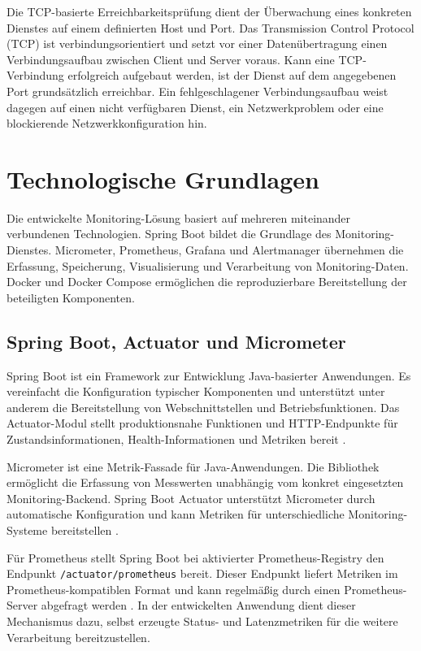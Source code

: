 Die TCP-basierte Erreichbarkeitsprüfung dient der Überwachung eines konkreten Dienstes auf einem definierten Host und Port. Das Transmission Control Protocol (TCP) ist verbindungsorientiert und setzt vor einer Datenübertragung einen Verbindungsaufbau zwischen Client und Server voraus. Kann eine TCP-Verbindung erfolgreich aufgebaut werden, ist der Dienst auf dem angegebenen Port grundsätzlich erreichbar. Ein fehlgeschlagener Verbindungsaufbau weist dagegen auf einen nicht verfügbaren Dienst, ein Netzwerkproblem oder eine blockierende Netzwerkkonfiguration hin.

\section{Technologische Grundlagen}

Die entwickelte Monitoring-Lösung basiert auf mehreren miteinander verbundenen Technologien. Spring Boot bildet die Grundlage des Monitoring-Dienstes. Micrometer, Prometheus, Grafana und Alertmanager übernehmen die Erfassung, Speicherung, Visualisierung und Verarbeitung von Monitoring-Daten. Docker und Docker Compose ermöglichen die reproduzierbare Bereitstellung der beteiligten Komponenten.

\subsection{Spring Boot, Actuator und Micrometer}

Spring Boot ist ein Framework zur Entwicklung Java-basierter Anwendungen. Es vereinfacht die Konfiguration typischer Komponenten und unterstützt unter anderem die Bereitstellung von Webschnittstellen und Betriebsfunktionen. Das Actuator-Modul stellt produktionsnahe Funktionen und HTTP-Endpunkte für Zustandsinformationen, Health-Informationen und Metriken bereit \cite{spring-boot-actuator-doc}.

Micrometer ist eine Metrik-Fassade für Java-Anwendungen. Die Bibliothek ermöglicht die Erfassung von Messwerten unabhängig vom konkret eingesetzten Monitoring-Backend. Spring Boot Actuator unterstützt Micrometer durch automatische Konfiguration und kann Metriken für unterschiedliche Monitoring-Systeme bereitstellen \cite{spring-boot-actuator-doc}.

Für Prometheus stellt Spring Boot bei aktivierter Prometheus-Registry den Endpunkt \texttt{/actuator/prometheus} bereit. Dieser Endpunkt liefert Metriken im Prometheus-kompatiblen Format und kann regelmäßig durch einen Prometheus-Server abgefragt werden \cite{spring-boot-actuator-doc}. In der entwickelten Anwendung dient dieser Mechanismus dazu, selbst erzeugte Status- und Latenzmetriken für die weitere Verarbeitung bereitzustellen.

